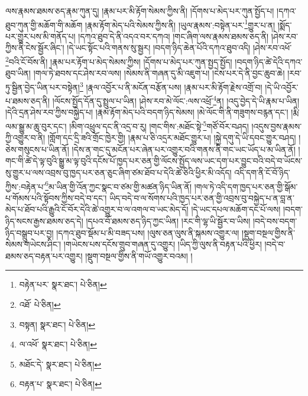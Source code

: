 ལས་རྣམས་ཐམས་ཅད་རྣམ་ཀུན་དུ། །རྣམ་པར་མི་རྟོག་སེམས་ཀྱིས་ནི། །དོགས་པ་མེད་པར་ཀུན་སྤྱོད་པ། །དཀའ་ཐུབ་ཀུན་གྱི་མཆོག་གི་མཆོག །རྣམ་རྟོག་མེད་པའི་སེམས་ཀྱིས་ནི། །ཡུལ་རྣམས་:བསྟེན་པར་\footnote{བརྟེན་པར་  སྣར་ཐང་།  པེ་ཅིན། }གྱུར་པ་ན། །སྨོད་པར་གྱུར་པས་མི་གནོད་པ། །དཀའ་ཐུབ་དེ་ནི་འདའ་བར་དཀའ། །གང་ཞིག་ལས་རྣམས་ཐམས་ཅད་ནི། །ཤེས་རབ་ཀྱིས་ནི་ངེས་སྦྱོར་ཞིང་། །དེ་ཡང་སྟོང་པའི་གནས་སུ་སྦྱར། །བདག་ཉིད་ཆེན་པོའི་དཀའ་ཐུབ་འདི། །ཤེས་རབ་འཕོ་\footnote{འཐོ་  པེ་ཅིན། }བའི་ངོ་བོས་ནི། །རྣམ་པར་རྟོག་པ་མེད་སེམས་ཀྱིས། །དོགས་པ་མེད་པར་ཀུན་སྤྱད་སྤྱོད། །བདག་ཉིད་ཚེ་དེའི་དཀའ་ཐུབ་ཡིན། །གལ་ཏེ་ཐབས་དང་ཤེས་རབ་ལས། །སེམས་ནི་གཞན་དུ་མི་འཇུག་པ། །ངེས་པར་དེ་ནི་བྱང་ཆུབ་ཆེ། །རབ་ཏུ་སྦྱིན་བྱེད་ཡིན་པར་བསྟེན།\footnote{བསྟན།  སྣར་ཐང་།  པེ་ཅིན། } །རྣལ་འབྱོར་པ་ནི་མངོན་བརྩོན་པས། །རྣམ་པར་མི་རྟོག་རྗེས་འགྲོ་བ། །དེ་ཡི་འབྱོར་པ་ཐམས་ཅད་ནི། །ལོངས་སྤྱོད་དོན་དུ་སྤྲུལ་པ་ཡིན། །ཤེས་རབ་མེ་ལོང་:ལས་འཕྲོ་\footnote{ལ་འཕོ་  སྣར་ཐང་།  པེ་ཅིན། }ན། །འདུ་བྱེད་དེ་ཡི་རྣམ་པ་ཡིན། །དེའི་དྲན་ཤེས་རབ་ཀྱིས་བསྐྱེད་པ། །རྣམ་རྟོག་མེད་པའི་བདག་ཉིད་སེམས། །མེ་ལོང་གི་ནི་གཟུགས་བརྙན་དང་། །རྨི་ལམ་སྒྱུ་མ་ཆུ་བུར་དང་། །མིག་འཕྲུལ་དང་ནི་འདྲ་བ་རུ། །གང་གིས་:མཐོང་སྟེ་\footnote{མཐོང་དེ་  སྣར་ཐང་།  པེ་ཅིན། }གཙོ་བོར་བཤད། །འདུས་བྱས་རྣམས་ཀྱི་འགྱུར་བ་ནི། །གློག་དང་དྲི་ཟའི་གྲོང་ཁྱེར་གྱི། །རྣམ་པ་ཅི་འདྲར་མཐོང་གྱུར་པ། །སྐྱེ་དགུ་དེ་ཡི་དབང་གྱུར་བཤད། །ཅེས་གསུངས་པ་ཡིན་ནོ། །དེས་ན་གང་དུ་མངོན་པར་ཞེན་པར་འགྱུར་བའི་གནས་ནི་གང་ཡང་ཡོད་པ་མ་ཡིན་ནོ། །གང་གི་ཚེ་དེ་ལྟ་བུའི་སྒྱུ་མ་ལྟ་བུའི་དངོས་པོ་ཁྱད་པར་ཅན་གྱི་ལོངས་སྤྱོད་ལས་ཡང་དག་པར་བྱུང་བའི་བདེ་བ་ཡོངས་སུ་གྱུར་པ་ལས་འབྲས་བུ་ཁྱད་པར་ཅན་ཅུང་ཞིག་ཙམ་ཐོབ་པ་དེའི་ཚེ་ཅིའི་ཕྱིར་མི་འདོད། འདི་དག་ནི་ངོ་བོ་ཉིད་ཀྱིས་:བརྟེན་པ་\footnote{བརྟན་པ་  སྣར་ཐང་།  པེ་ཅིན། }མ་ཡིན་གྱི་འོན་ཀྱང་སྣང་བ་ཙམ་གྱི་མཚན་ཉིད་ཡིན་ནོ། །གལ་ཏེ་འདི་དག་ཁྱད་པར་ཅན་གྱི་སྒོམ་པ་གོམས་པའི་སྟོབས་ཀྱིས་བདེ་བ་དང་། ཡིད་བདེ་བ་ལ་སོགས་པའི་ཁྱད་པར་ཅན་གྱི་འབྲས་བུ་བསྐྱེད་པ་ན་བླ་ན་མེད་པ་ཐོབ་པའི་རྒྱུའི་ངོ་བོར་དེའི་ཚེ་འགྱུར་བ་ལ་འགལ་བ་ཡང་མེད་དོ། །དེ་ཡང་དཔལ་མཆོག་དང་པོ་ལས། །བདག་ཉིད་སངས་རྒྱས་ཐམས་ཅད་དེ། །དཔའ་བོ་ཐམས་ཅད་ཉིད་ཀྱང་ཡིན། །རང་གི་ལྷ་ཡི་སྦྱོར་བ་ཡིས། །བདེ་བས་བདག་ཉིད་བསྒྲུབ་པར་བྱ། །དཀའ་ཐུབ་སྡོམ་པ་མི་བཟད་པས། །ལུས་ཅན་ལུས་ནི་སྐམས་འགྱུར་ལ། །སྡུག་བསྔལ་གྱིས་ནི་སེམས་གཡེངས་ཤིང་། །གཡེངས་པས་དངོས་གྲུབ་གཞན་དུ་འགྱུར། །ཡིད་ཀྱི་ལུས་ནི་བརྟན་པའི་ཕྱིར། །བདེ་བ་ཐམས་ཅད་བརྟན་པར་འགྱུར། །སྡུག་བསྔལ་གྱིས་ནི་གཡོ་འགྱུར་བའམ། །
